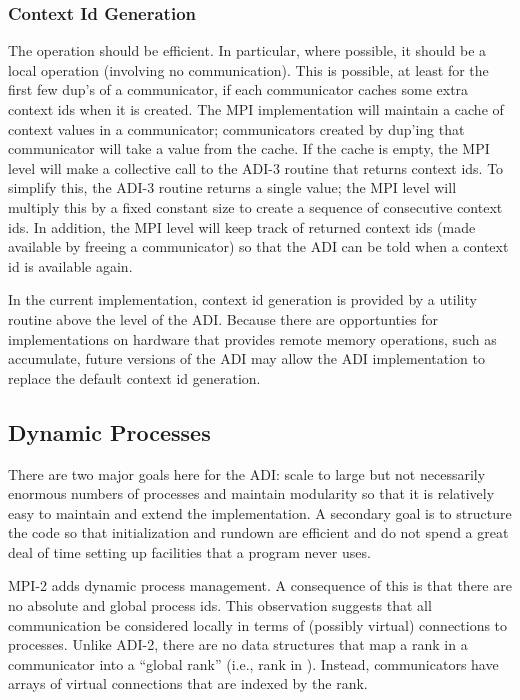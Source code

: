 \subsubsection{Context Id Generation}
\label{sec:context-id-generation}
The operation  should be efficient.  In particular,
where possible, it should be a local operation (involving no
communication).  This is possible, at least for the first few dup's of
a communicator, if each communicator caches some extra context ids
when it is created.  The MPI implementation will maintain a cache of
context values in a communicator; communicators created by dup'ing
that communicator will take a value from the cache.  If the cache is
empty, the MPI level will make a collective call to the ADI-3 routine
that returns context ids.  To simplify this, the ADI-3 routine returns
a single value; the MPI level will multiply this by a fixed constant
size to create a sequence of consecutive context ids.  In addition,
the MPI level will keep track of returned context ids (made available
by freeing a communicator) so that the ADI can be told when a context
id is available again.

In the current implementation, context id generation is provided by a
utility routine above the level of the ADI.  Because there are opportunties
for implementations on hardware that provides remote memory operations,
such as accumulate, future versions of the ADI may allow the ADI
implementation to replace the default context id generation.

\subsection{Dynamic Processes}
There are two major goals here for the ADI:  scale to large but not
necessarily enormous numbers of processes and maintain modularity so
that it is relatively easy to maintain and extend the implementation.
A secondary goal is to structure the code so that initialization and
rundown are efficient and do not spend a great deal of time setting up
facilities that a program never uses.

MPI-2 adds dynamic process management.  A consequence of this is that
there are no absolute and global process ids.  This observation
suggests that all communication be considered locally in terms of
(possibly virtual) connections to processes.  Unlike ADI-2, there are
no data structures that map a rank in a communicator into a ``global
rank'' (i.e., rank in ).  Instead, communicators
have arrays of virtual connections that are indexed by the rank.

